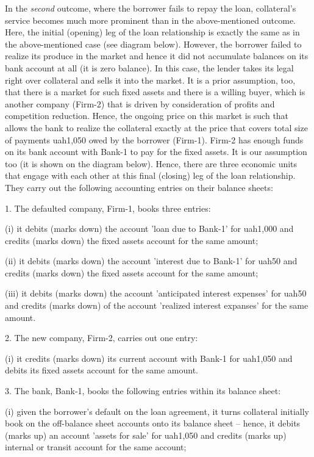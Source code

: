 In the \textit{second} outcome, where the borrower fails to repay the loan, collateral's service becomes much more prominent than in the above-mentioned outcome. Here, the initial (opening) leg of the loan relationship is exactly the same as in the above-mentioned case (see diagram below). However, the borrower failed to realize its produce in the market and hence it did not accumulate balances on its bank account at all (it is zero balance). In this case, the lender takes its legal right over collateral and sells it into the market. It is a prior assumption, too, that there is a market for such fixed assets and there is a willing buyer, which is another company (Firm-2) that is driven by consideration of profits and competition reduction. Hence, the ongoing price on this market is such that allows the bank to realize the collateral exactly at the price that covers total size of payments \ac{uah}1,050 owed by the borrower (Firm-1). Firm-2 has enough funds on its bank account with Bank-1 to pay for the fixed assets. It is our assumption too (it is shown on the diagram below). Hence, there are three economic units that engage with each other at this final (closing) leg of the loan relationship. They carry out the following accounting entries on their balance sheets: \par

1. The defaulted company, Firm-1, books three entries:

(i) it debits (marks down) the account 'loan due to Bank-1' for \ac{uah}1,000 and credits (marks down) the fixed assets account for the same amount;

(ii) it debits (marks down) the account 'interest due to Bank-1' for \ac{uah}50 and credits (marks down) the fixed assets account for the same amount;

(iii) it debits (marks down) the account 'anticipated interest expenses' for \ac{uah}50 and credits (marks down) of the account 'realized interest expanses' for the same amount.

2. The new company, Firm-2, carries out one entry:

(i) it credits (marks down) its current account with Bank-1 for \ac{uah}1,050 and debits its fixed assets account for the same amount.

3. The bank, Bank-1, books the following entries within its balance sheet:

(i) given the borrower's default on the loan agreement, it turns collateral initially book on the off-balance sheet accounts onto its balance sheet -- hence, it debits (marks up) an account 'assets for sale' for \ac{uah}1,050 and credits (marks up) internal or transit account for the same account;

